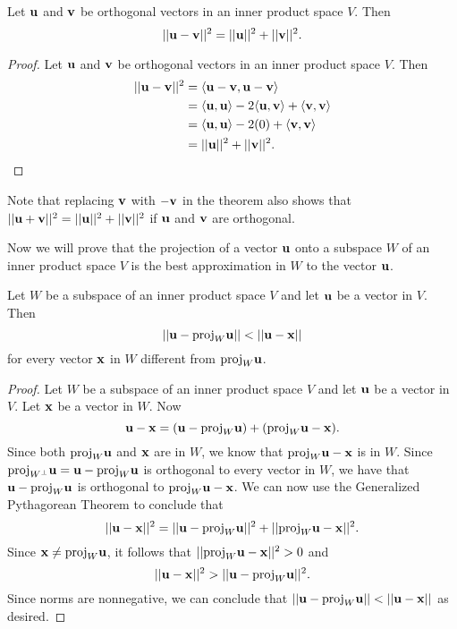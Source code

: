 \begin{theorem} \label{thm:6_c_PT} Let $\mathbf{u}$ and $\mathbf{v}$ be orthogonal vectors in an inner product space $V$. Then
\[||\mathbf{u} - \mathbf{v}||^2 = ||\mathbf{u}||^2 + ||\mathbf{v}||^2.\]
\end{theorem}

\begin{proof} Let $\mathbf{u}$ and $\mathbf{v}$ be orthogonal vectors in an inner product space $V$. Then
\begin{align*}
|| \mathbf{u} - \mathbf{v} ||^2 &= \langle \mathbf{u}-\mathbf{v}, \mathbf{u}-\mathbf{v} \rangle \\
	&= \langle \mathbf{u},\mathbf{u} \rangle - 2 \langle \mathbf{u},\mathbf{v} \rangle + \langle \mathbf{v}, \mathbf{v} \rangle \\
	&= \langle \mathbf{u},\mathbf{u} \rangle - 2 (0) + \langle \mathbf{v}, \mathbf{v} \rangle \\
	&= ||\mathbf{u}||^2 + ||\mathbf{v}||^2.
\end{align*}
\end{proof}
Note that replacing $\mathbf{v}$ with $-\mathbf{v}$ in the theorem also shows that $||\mathbf{u} + \mathbf{v}||^2 = ||\mathbf{u}||^2 + ||\mathbf{v}||^2$ if $\mathbf{u}$ and $\mathbf{v}$ are orthogonal.

Now we will prove that the projection of a vector $\mathbf{u}$ onto a subspace $W$ of an inner product space $V$ is the best approximation in $W$ to the vector $\mathbf{u}$.

\begin{theorem} \label{thm:6_c_best_approx} Let $W$ be a subspace of an inner product space $V$ and let $\mathbf{u}$ be a vector in $V$. Then
\[||\mathbf{u} - \text{proj}_W \mathbf{u} || < || \mathbf{u} - \mathbf{x} ||\]
for every vector $\mathbf{x}$ in $W$ different from $\text{proj}_W \mathbf{u}$.
\end{theorem}

\begin{proof} Let $W$ be a subspace of an inner product space $V$ and let $\mathbf{u}$ be a vector in $V$. Let $\mathbf{x}$ be a vector in $W$. Now
\[\mathbf{u} - \mathbf{x} = (\mathbf{u}-\text{proj}_W \mathbf{u}) + (\text{proj}_W \mathbf{u} - \mathbf{x}).\]
Since both $\text{proj}_W \mathbf{u}$ and $\mathbf{x}$ are in $W$, we know that $\text{proj}_W \mathbf{u} - \mathbf{x}$ is in $W$. Since $\text{proj}_{W^{\perp}} \mathbf{u} = \mathbf{u}-\text{proj}_W \mathbf{u}$ is orthogonal to every vector in $W$, we have that $\mathbf{u}-\text{proj}_W \mathbf{u}$ is orthogonal to $\text{proj}_W \mathbf{u} - \mathbf{x}$. We can now use the Generalized Pythagorean Theorem to conclude that
\[||\mathbf{u} - \mathbf{x}||^2 = ||\mathbf{u}-\text{proj}_W \mathbf{u}||^2 + ||\text{proj}_W \mathbf{u} - \mathbf{x}||^2.\]
Since $\mathbf{x} \neq \text{proj}_W \mathbf{u}$, it follows that $||\text{proj}_W \mathbf{u} - \mathbf{x}||^2 > 0$ and
\[|| \mathbf{u} - \mathbf{x} ||^2 > ||\mathbf{u} - \text{proj}_W \mathbf{u} ||^2.\]
Since norms are nonnegative, we can conclude that $||\mathbf{u} - \text{proj}_W \mathbf{u} || < || \mathbf{u} - \mathbf{x} ||$ as desired.
\end{proof}

